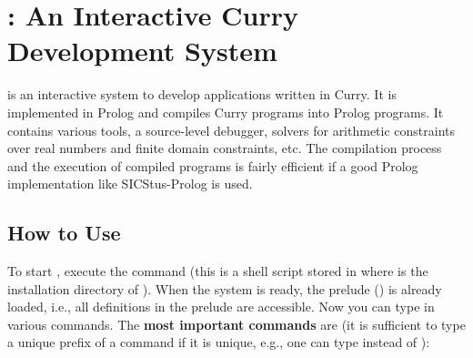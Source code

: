 \section{\CYS: An Interactive Curry Development System}
\label{sec-curry2prolog}

\CYS\index{\CYS} is an interactive system to develop applications
written in Curry.
It is implemented in Prolog and compiles
Curry programs into Prolog programs. It contains various tools,
a source-level debugger,
solvers for arithmetic constraints over real numbers
and finite domain constraints, etc. The compilation process and the
execution of compiled programs is fairly efficient
if a good Prolog implementation like SICStus-Prolog is used.


\subsection{How to Use \CYS}
\label{sec-use-curry2prolog}

To start \CYS, execute the command
(this is a shell script stored in
 where \cyshome is the installation directory
of \CYS).
When the system is ready, the prelude ()
is already loaded, i.e., all definitions in the prelude are accessible.
Now you can type in various commands.
The {\bf most important commands} are
(it is sufficient to type a unique prefix of a command if it is unique,
e.g., one can type  instead of ):

